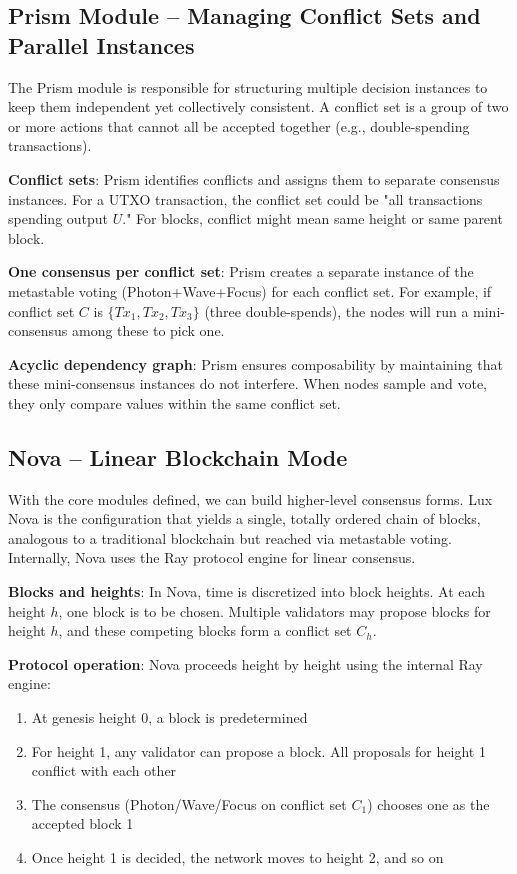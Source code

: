 \subsection{Prism Module – Managing Conflict Sets and Parallel Instances}

The Prism module is responsible for structuring multiple decision instances to keep them independent yet collectively consistent. A conflict set is a group of two or more actions that cannot all be accepted together (e.g., double-spending transactions).

\textbf{Conflict sets}: Prism identifies conflicts and assigns them to separate consensus instances. For a UTXO transaction, the conflict set could be "all transactions spending output $U$." For blocks, conflict might mean same height or same parent block.

\textbf{One consensus per conflict set}: Prism creates a separate instance of the metastable voting (Photon+Wave+Focus) for each conflict set. For example, if conflict set $C$ is $\{Tx_1, Tx_2, Tx_3\}$ (three double-spends), the nodes will run a mini-consensus among these to pick one.

\textbf{Acyclic dependency graph}: Prism ensures composability by maintaining that these mini-consensus instances do not interfere. When nodes sample and vote, they only compare values within the same conflict set.

\subsection{Nova – Linear Blockchain Mode}

With the core modules defined, we can build higher-level consensus forms. Lux Nova is the configuration that yields a single, totally ordered chain of blocks, analogous to a traditional blockchain but reached via metastable voting. Internally, Nova uses the Ray protocol engine for linear consensus.

\textbf{Blocks and heights}: In Nova, time is discretized into block heights. At each height $h$, one block is to be chosen. Multiple validators may propose blocks for height $h$, and these competing blocks form a conflict set $C_h$.

\textbf{Protocol operation}: Nova proceeds height by height using the internal Ray engine:
\begin{enumerate}
\item At genesis height 0, a block is predetermined
\item For height 1, any validator can propose a block. All proposals for height 1 conflict with each other
\item The consensus (Photon/Wave/Focus on conflict set $C_1$) chooses one as the accepted block 1
\item Once height 1 is decided, the network moves to height 2, and so on
\end{enumerate}

